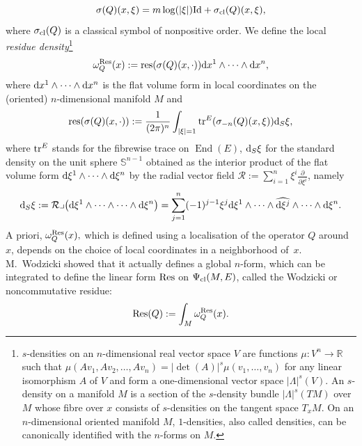 \documentclass[pdftex]{sigma}
\numberwithin{equation}{section}
\theoremstyle{definition}
\newcommand{\R}{\mathbb R}
\begin{document}
\[
\sigma(Q)(x,\xi)=m \log (|\xi|){\rm Id} +\sigma_{\rm cl}( Q)(x,\xi),
\]
where $\sigma_{\rm cl}(Q)$ is a classical symbol of nonpositive order.
We define the local {\it residue density}\footnote{$s$-densities on an $n$-dimensional real vector space $V$ are functions $\mu\colon V^n\to \R$ such that $\mu(Av_1, Av_2, \dots, A v_n)=\allowbreak \vert \det (A)\vert^s \mu(v_1, \dots, v_n)$ for any linear isomorphism $A$ of $V$ and form a one-dimensional vector space $\vert \Lambda \vert^s(V)$. An $s$-density on a manifold $M$ is a section of the $s$-density bundle $\vert \Lambda\vert^s(TM)$ over $M$ whose fibre over $x$ consists of $s$-densities on the tangent space $T_xM$. On an $n$-dimensional oriented manifold $M$, $1$-densities, also called densities, can be canonically identified with the $n$-forms on $ M$.}
\begin{equation}\label{eq:Wodzres}
 \omega_Q^{\rm Res}(x):= {\rm res}(\sigma(Q)(x,\cdot)) {\rm d}x^1\wedge\dots \wedge {\rm d}x^n ,
 \end{equation}
where $ {\rm d}x^1\wedge\dots \wedge {\rm d}x^n $ is the flat volume form in local coordinates on the (oriented) $n$-dimensional manifold $M$ and
\[ {\rm res}(\sigma(Q)(x,\cdot)):=\frac{1}{(2\pi)^n} \int_{|\xi|=1}{\rm tr}^E(\sigma_{-n}(Q) (x, \xi)) {\rm d}_S\xi,\]
where ${\rm tr}^E$ stands for the fibrewise trace on $\operatorname{End}(E)$, ${\rm d}_{S}\xi$ for the standard density on the unit sphere $\mathbb{S}^{n-1}$ obtained as the interior product of the flat volume form ${\rm d}\xi^1\wedge \dots \wedge {\rm d}\xi^n$ by the radial vector field ${\mathcal R} :=\sum_{i=1}^n \xi^i\frac{\partial}{\partial\xi^i}$, namely
\[
{\rm d}_{S}\xi:={\mathcal R}\lrcorner\bigl({\rm d}\xi^1\wedge\dots \wedge \dots \wedge {\rm d}\xi^n\bigr)= \sum_{j=1}^{n} (-1)^{j-1} \xi^j {\rm d}\xi^1\wedge\dots \wedge \widehat{{\rm d}\xi^j}\wedge \dots \wedge {\rm d}\xi^n.
\]
A priori, $\omega_Q^{\rm Res}(x),$ which is defined using a localisation of the operator $Q$ around $x$, depends on the choice of local coordinates in a neighborhood of~$x$.
M.~Wodzicki \cite{W} showed that it actually defines a global $n$-form, which can be integrated to define the linear form ${\rm Res}$ on $\Psi_{\rm cl}(M, E)$, called the Wodzicki or noncommutative residue:
\[{\rm Res}(Q):= \int_M \omega_Q^{\rm Res}(x).\]
\end{document}
